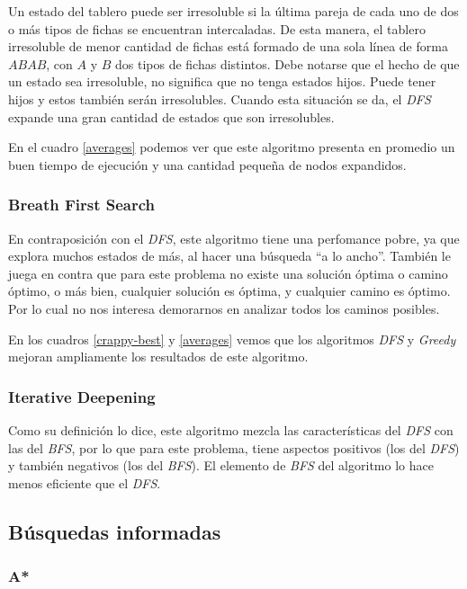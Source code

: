 \documentclass[a4paper,10pt]{article}
\begin{document}
    Un estado del tablero puede ser irresoluble si la última pareja de cada uno de dos o más tipos de fichas se encuentran intercaladas.
    De esta manera, el tablero irresoluble de menor cantidad de fichas está formado de una sola línea de forma $ABAB$, con $A$ y $B$ dos tipos de fichas distintos.
    Debe notarse que el hecho de que un estado sea irresoluble, no significa que no tenga estados hijos.
    Puede tener hijos y estos también serán irresolubles.
    Cuando esta situación se da, el \textit{DFS} expande una gran cantidad de estados que son irresolubles.

    En el cuadro \ref{averages} podemos ver que este algoritmo presenta en promedio un buen tiempo de ejecución y una cantidad pequeña de nodos expandidos.
    
    \subsubsection{Breath First Search}
    En contraposición con el \textit{DFS}, este algoritmo tiene una perfomance pobre, ya que explora muchos estados de más, al hacer una búsqueda ``a lo ancho''.
    También le juega en contra que para este problema no existe una solución óptima o camino óptimo, o más bien, cualquier solución es óptima, y cualquier camino es óptimo. 
    Por lo cual no nos interesa demorarnos en analizar todos los caminos posibles.

    En los cuadros \ref{crappy-best} y \ref{averages} vemos que los algoritmos \textit{DFS} y \textit{Greedy} mejoran ampliamente los resultados de este algoritmo.

    \subsubsection{Iterative Deepening}

    Como su definición lo dice, este algoritmo mezcla las características del \textit{DFS} con las del \textit{BFS}, por lo que para este problema, tiene aspectos positivos (los del 
    \textit{DFS}) y también negativos (los del \textit{BFS}). 
    El elemento de \textit{BFS} del algoritmo lo hace menos eficiente que el \textit{DFS}.

\subsection{Búsquedas informadas}
    
    \subsubsection{A*}
    
\end{document}

